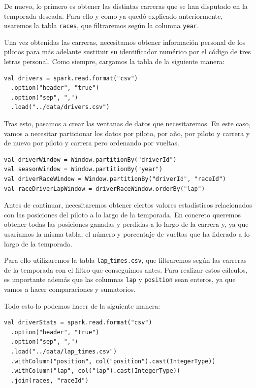 \documentclass[12pt,twoside,titlepage]{report}
\begin{document}
De nuevo, lo primero es obtener las distintas carreras que se han disputado en la temporada deseada. Para ello y como ya quedó explicado anteriormente, usaremos la tabla \texttt{races}, que filtraremos según la columna \texttt{year}.

Una vez obtenidas las carreras, necesitamos obtener información personal de los pilotos para más adelante sustituir su identificador numérico por el código de tres letras personal. Como siempre, cargamos la tabla de la siguiente manera:

\begin{lstlisting}
val drivers = spark.read.format("csv")
  .option("header", "true")
  .option("sep", ",")
  .load("../data/drivers.csv")
\end{lstlisting}

Tras esto, pasamos a crear las ventanas de datos que necesitaremos. En este caso, vamos a necesitar particionar los datos por piloto, por año, por piloto y carrera y de nuevo por piloto y carrera pero ordenando por vueltas. 

\begin{lstlisting}
val driverWindow = Window.partitionBy("driverId")
val seasonWindow = Window.partitionBy("year")
val driverRaceWindow = Window.partitionBy("driverId", "raceId")
val raceDriverLapWindow = driverRaceWindow.orderBy("lap")
\end{lstlisting}

Antes de continuar, necesitaremos obtener ciertos valores estadísticos relacionados con las posiciones del piloto a lo largo de la temporada. En concreto queremos obtener todas las posiciones ganadas y perdidas a lo largo de la carrera y, ya que usaríamos la misma tabla, el número y porcentaje de vueltas que ha liderado a lo largo de la temporada.

Para ello utilizaremos la tabla \texttt{lap$\_$times.csv}, que filtraremos según las carreras de la temporada con el filtro que conseguimos antes. Para realizar estos cálculos, es importante además que las columnas \texttt{lap} y \texttt{position} sean enteros, ya que vamos a hacer comparaciones y sumatorios.

Todo esto lo podemos hacer de la siguiente manera:

\begin{lstlisting}
val driverStats = spark.read.format("csv")
  .option("header", "true")
  .option("sep", ",")
  .load("../data/lap_times.csv")
  .withColumn("position", col("position").cast(IntegerType)) 
  .withColumn("lap", col("lap").cast(IntegerType)) 
  .join(races, "raceId")
\end{lstlisting}
\end{document}
